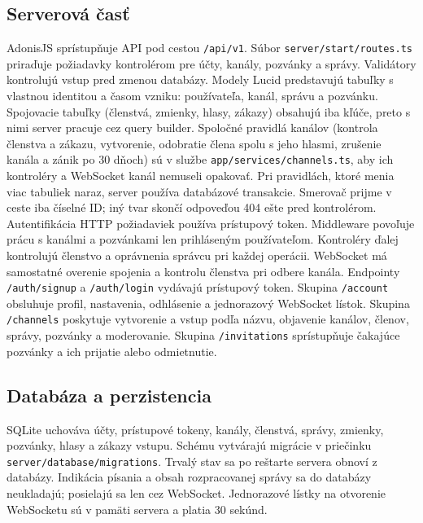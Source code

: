 \documentclass[11pt,a4paper]{article}
\begin{document}
\subsection{Serverová časť}
AdonisJS sprístupňuje API pod cestou \texttt{/api/v1}. Súbor
\texttt{server/start/routes.ts} priraďuje požiadavky kontrolérom pre účty,
kanály, pozvánky a správy. Validátory kontrolujú vstup pred zmenou databázy.
Modely Lucid predstavujú tabuľky s vlastnou identitou a časom vzniku:
používateľa, kanál, správu a pozvánku. Spojovacie tabuľky (členstvá, zmienky,
hlasy, zákazy) obsahujú iba kľúče, preto s nimi server pracuje cez query
builder. Spoločné pravidlá kanálov (kontrola členstva a zákazu, vytvorenie,
odobratie člena spolu s jeho hlasmi, zrušenie kanála a zánik po 30 dňoch)
sú v službe \texttt{app/services/channels.ts}, aby ich kontroléry
a WebSocket kanál nemuseli opakovať. Pri pravidlách, ktoré menia viac
tabuliek naraz, server používa databázové transakcie. Smerovač prijme
v ceste iba číselné ID; iný tvar skončí odpoveďou 404 ešte pred kontrolérom.
Autentifikácia HTTP požiadaviek používa prístupový token. Middleware povoľuje
prácu s kanálmi a pozvánkami len prihláseným používateľom. Kontroléry ďalej
kontrolujú členstvo a oprávnenia správcu pri každej operácii. WebSocket má
samostatné overenie spojenia a kontrolu členstva pri odbere kanála.
Endpointy \texttt{/auth/signup} a \texttt{/auth/login} vydávajú prístupový
token. Skupina \texttt{/account} obsluhuje profil, nastavenia, odhlásenie
a jednorazový WebSocket lístok. Skupina \texttt{/channels} poskytuje
vytvorenie a vstup podľa názvu, objavenie kanálov, členov, správy,
pozvánky a moderovanie. Skupina \texttt{/invitations} sprístupňuje
čakajúce pozvánky a ich prijatie alebo odmietnutie.

\subsection{Databáza a perzistencia}
SQLite uchováva účty, prístupové tokeny, kanály, členstvá, správy, zmienky,
pozvánky, hlasy a zákazy vstupu. Schému vytvárajú migrácie v priečinku
\texttt{server/database/migrations}. Trvalý stav sa po reštarte servera obnoví
z databázy. Indikácia písania a obsah rozpracovanej správy sa do databázy
neukladajú; posielajú sa len cez WebSocket. Jednorazové lístky na otvorenie
WebSocketu sú v pamäti servera a platia 30 sekúnd.
\end{document}
